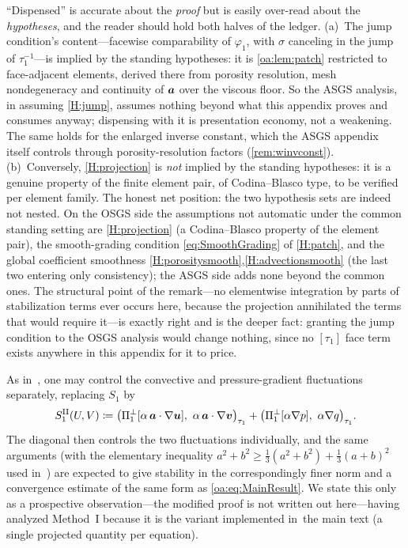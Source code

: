 \begin{pedagogy}
``Dispensed'' is accurate about the \emph{proof} but is
easily over-read about the \emph{hypotheses}, and the reader should hold both
halves of the ledger. (a)~The jump condition's content---facewise comparability
of $\varphi_1$, with $\sigma$ canceling in the jump of $\tau_1^{-1}$---is
implied by the standing hypotheses: it is \cref{oa:lem:patch} restricted to
face-adjacent elements, derived there from porosity resolution, mesh
nondegeneracy and continuity of $\boldsymbol{a}$ over the viscous floor. So the ASGS
analysis, in assuming \cref{H:jump}, assumes nothing beyond what this appendix
proves and consumes anyway; dispensing with it is presentation economy, not a
weakening. The same holds for the enlarged inverse constant, which the ASGS
appendix itself controls through porosity-resolution factors
(\cref{rem:winvconst}). (b)~Conversely, \cref{H:projection} is \emph{not}
implied by the standing hypotheses: it is a genuine property of the finite
element pair, of Codina--Blasco type, to be verified per element family. The
honest net position: the two hypothesis sets are indeed not nested. On the OSGS side the
assumptions not automatic under the common standing setting are \cref{H:projection} (a
Codina--Blasco property of the element pair), the smooth{\hyp}grading condition \cref{eq:SmoothGrading}
of \cref{H:patch}, and the global coefficient smoothness \cref{H:porositysmooth},\cref{H:advectionsmooth}
(the last two entering only consistency); the ASGS side adds none beyond the common ones. The structural
point of the remark---no elementwise integration by parts of stabilization
terms ever occurs here, because the projection annihilated the terms that
would require it---is exactly right and is the deeper fact: granting the jump
condition to the OSGS analysis would change nothing, since no $[\tau_1]$ face
term exists anywhere in this appendix for it to price.
\end{pedagogy}

\begin{remark}
\label{oa:rem:methodII}
As in~\cite[\S 2.2]{codina2008analysis}, one may control the convective and pressure-gradient
fluctuations separately, replacing $S_1$ by
\[
  S_1^{\mathrm{II}}(U,V) \coloneqq
  \bigl( \Pi_{1}^{\perp}[\alpha\,\boldsymbol{a}\cdot\nabla\boldsymbol{u}],\ \alpha\,\boldsymbol{a}\cdot\nabla\boldsymbol{v} \bigr)_{\tau_1}
  + \bigl( \Pi_{1}^{\perp}[\alpha\nabla p],\ \alpha\nabla q \bigr)_{\tau_1}.
\]
The diagonal then controls the two fluctuations individually, and the same arguments
(with the elementary inequality $a^2 + b^2 \ge \tfrac13(a^2+b^2) + \tfrac13(a+b)^2$
used in~\cite[Theorem~3]{codina2008analysis}) are expected to give stability in the correspondingly
finer norm and a convergence estimate of the same form as \cref{oa:eq:MainResult}. We state
this only as a prospective observation---the modified proof is not written out here---having
analyzed Method~I because it is the variant implemented in~the main text (a single
projected quantity per equation).
\end{remark}

